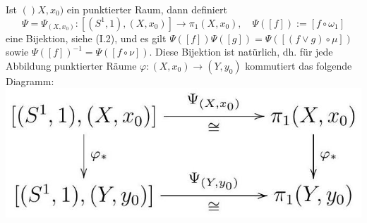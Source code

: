 \documentclass[10pt, letterpaper]{article}
\begin{document}
Ist $()X, x_{0})$ ein punktierter Raum, dann definiert
$$
\Psi=\Psi_{\left(X, x_{0}\right)}:\left[\left(S^{1}, 1\right),\left(X, x_{0}\right)\right] \rightarrow \pi_{1}\left(X, x_{0}\right), \quad \Psi([f]):=\left[f \circ \omega_{1}\right]
$$
eine Bijektion, siehe (I.2), und es gilt $\Psi([f]) \Psi([g])=\Psi([(f \vee g) \circ \mu])$ sowie $\Psi([f])^{-1}=\Psi([f \circ \nu])$. Diese Bijektion ist natürlich, dh. für jede Abbildung punktierter Räume $\varphi:\left(X, x_{0}\right) \rightarrow\left(Y, y_{0}\right)$ kommutiert das folgende Diagramm:\\
\includegraphics[max width=\textwidth, center]{2025_06_05_d7ed2bacd1e9ce1db1f0g-032}
\end{document}
